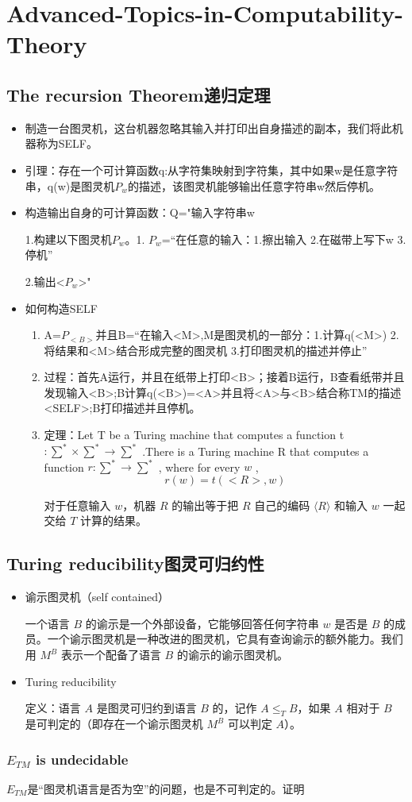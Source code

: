 \documentclass[UTF8]{ctexart}
\begin{document}
\section{Advanced-Topics-in-Computability-Theory}

\subsection{The recursion Theorem递归定理}

\begin{itemize}
    \item 制造一台图灵机，这台机器忽略其输入并打印出自身描述的副本，我们将此机器称为SELF。
    \item 引理：存在一个可计算函数q:从字符集映射到字符集，其中如果w是任意字符串，q(w)是图灵机$P_w$的描述，该图灵机能够输出任意字符串w然后停机。
    \item 构造输出自身的可计算函数：Q="输入字符串w 
    
    1.构建以下图灵机$P_w$。1. $P_w$=“在任意的输入：1.擦出输入 2.在磁带上写下w 3.停机” 
    
    2.输出<$P_w$>"

    \item 如何构造SELF
    \begin{enumerate}
        \item A=$P_{<B>}$并且B=“在输入<M>,M是图灵机的一部分：1.计算q(<M>) 2.将结果和<M>结合形成完整的图灵机 3.打印图灵机的描述并停止”
        \item 过程：首先A运行，并且在纸带上打印<B>；接着B运行，B查看纸带并且发现输入<B>;B计算q(<B>)=<A>并且将<A>与<B>结合称TM的描述<SELF>;B打印描述并且停机。   
        \item 定理：Let T be a Turing machine that computes a function t \(: \sum ^{*} ×\sum ^{*} \to \sum ^{*}\) .There is a Turing machine R that computes a function \(r: \sum ^{*} \to \sum ^{*}\) , where for every \(w\) , \[r(w)=t(< R>, w)\]
        
        对于任意输入 $w$，机器 $R$ 的输出等于把 $R$ 自己的编码 $\langle R \rangle$ 和输入 $w$ 一起交给 $T$ 计算的结果。
    \end{enumerate}
\end{itemize}

\subsection{Turing reducibility图灵可归约性}

\begin{itemize}
    \item 谕示图灵机（self contained）
    
    一个语言 \( B \) 的谕示是一个外部设备，它能够回答任何字符串 \( w \) 是否是 \( B \) 的成员。一个谕示图灵机是一种改进的图灵机，它具有查询谕示的额外能力。我们用 \( M^B \) 表示一个配备了语言 \( B \) 的谕示的谕示图灵机。

    \item Turing reducibility
    
    定义：语言 $A$ 是图灵可归约到语言 $B$ 的，记作 $A \leq_T B$，如果 $A$ 相对于 $B$ 是可判定的（即存在一个谕示图灵机 $M^B$ 可以判定 $A$）。
    

\end{itemize}

\subsubsection{$E_{TM}$ is undecidable}

$E_{TM}$是“图灵机语言是否为空”的问题，也是不可判定的。证明
\end{document}
